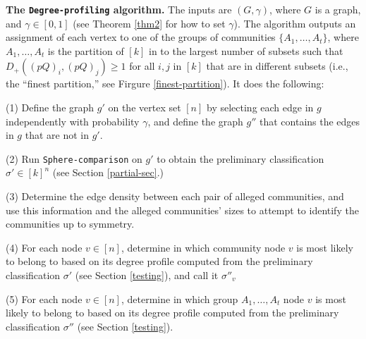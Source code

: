 \documentclass[11pt]{article}
\newcommand{\dd}{D_+}
\newcommand{\1}{\mathbb{1}}
\begin{document}
{\bf The {\tt Degree-profiling} algorithm.} The inputs are $(G, \gamma)$, where $G$ is a graph, and $\gamma\in [0,1]$ (see Theorem \ref{thm2} for how to set $\gamma$). The algorithm outputs an assignment of each vertex to one of the groups of communities $\{A_1,\dots,A_t\}$, where $A_1,\dots,A_t$ is the partition of $[k]$ in to the largest number of subsets such that $\dd((pQ)_i,(pQ)_j) \geq 1$ for all $i,j$ in $[k]$ that are in different subsets (i.e., the ``finest partition,'' see Firgure \ref{finest-partition}). It does the following:

(1) Define the graph $g'$ on the vertex set $[n]$ by selecting each edge in $g$ independently with probability $\gamma$, and define the graph $g''$ that contains the edges in $g$ that are not in $g'$. 

(2) Run {\tt Sphere-comparison} on $g'$ to obtain the preliminary classification $\sigma' \in [k]^n$ (see Section \ref{partial-sec}.) 

(3) Determine the edge density between each pair of alleged communities, and use this information and the alleged communities' sizes to attempt to identify the communities up to symmetry. 

(4) For each node $v \in [n]$, determine in which community node $v$ is most likely to belong to based on its degree profile computed from the preliminary classification $\sigma'$ (see Section \ref{testing}), and call it $\sigma''_v$

(5) For each node $v \in [n]$, determine in which group $A_1,\dots,A_t$ node $v$ is most likely to belong to based on its degree profile computed from the preliminary classification $\sigma''$ (see Section \ref{testing}). 






\end{document}
